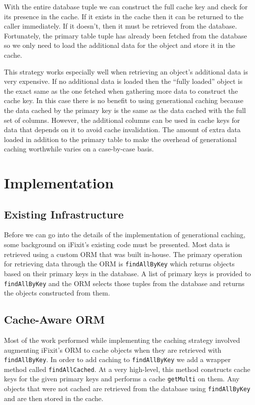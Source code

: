 \documentclass[12pt]{ucthesis}
\begin{document}
With the entire database tuple we can construct the full cache key and check for its presence in the cache.
If it exists in the cache then it can be returned to the caller immediately.
If it doesn't, then it must be retrieved from the database.
Fortunately, the primary table tuple has already been fetched from the database so we only need to load the additional data for the object and store it in the cache.

This strategy works especially well when retrieving an object's additional data is very expensive.
If no additional data is loaded then the ``fully loaded'' object is the exact same as the one fetched when gathering more data to construct the cache key.
In this case there is no benefit to using generational caching because the data cached by the primary key is the same as the data cached with the full set of columns.
However, the additional columns can be used in cache keys for data that depends on it to avoid cache invalidation.
The amount of extra data loaded in addition to the primary table to make the overhead of generational caching worthwhile varies on a case-by-case basis.


\section{Implementation}
\subsection{Existing Infrastructure}
Before we can go into the details of the implementation of generational caching, some background on \textsf{iFixit}'s existing code must be presented.
Most data is retrieved using a custom ORM that was built in-house.
The primary operation for retrieving data through the ORM is {\tt findAllByKey} which returns objects based on their primary keys in the database.
A list of primary keys is provided to {\tt findAllByKey} and the ORM selects those tuples from the database and returns the objects constructed from them.

\subsection{Cache-Aware ORM}
Most of the work performed while implementing the caching strategy involved augmenting \textsf{iFixit}'s ORM to cache objects when they are retrieved with {\tt findAllByKey}.
In order to add caching to {\tt findAllByKey} we add a wrapper method called {\tt findAllCached}.
At a very high-level, this method constructs cache keys for the given primary keys and performs a cache {\tt getMulti} on them.
Any objects that were not cached are retrieved from the database using {\tt findAllByKey} and are then stored in the cache.
\end{document}
